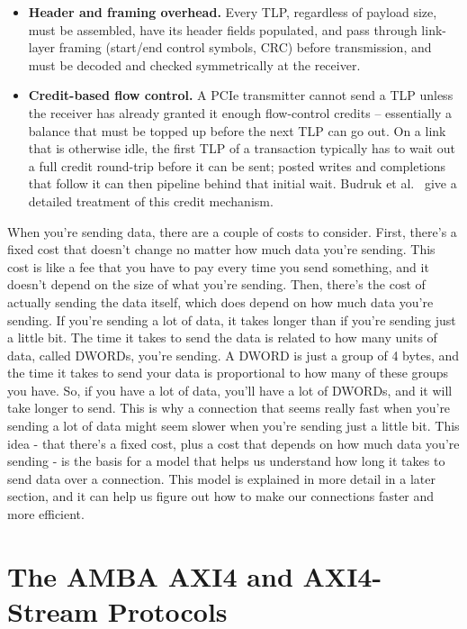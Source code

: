 \begin{itemize}
\item \textbf{Header and framing overhead.} Every TLP, regardless of payload size, must be assembled, have its header fields populated, and pass through link-layer framing (start/end control symbols, CRC) before transmission, and must be decoded and checked symmetrically at the receiver.
\item \textbf{Credit-based flow control.} A PCIe transmitter cannot send a TLP unless the receiver has already granted it enough flow-control credits -- essentially a balance that must be topped up before the next TLP can go out. On a link that is otherwise idle, the first TLP of a transaction typically has to wait out a full credit round-trip before it can be sent; posted writes and completions that follow it can then pipeline behind that initial wait. Budruk et al.~\cite{budruk2004pcie} give a detailed treatment of this credit mechanism.
\end{itemize}

When you're sending data, there are a couple of costs to consider. First, there's a fixed cost that doesn't change no matter how much data you're sending. This cost is like a fee that you have to pay every time you send something, and it doesn't depend on the size of what you're sending. Then, there's the cost of actually sending the data itself, which does depend on how much data you're sending. If you're sending a lot of data, it takes longer than if you're sending just a little bit. The time it takes to send the data is related to how many units of data, called DWORDs, you're sending. A DWORD is just a group of 4 bytes, and the time it takes to send your data is proportional to how many of these groups you have. So, if you have a lot of data, you'll have a lot of DWORDs, and it will take longer to send. This is why a connection that seems really fast when you're sending a lot of data might seem slower when you're sending just a little bit. This idea - that there's a fixed cost, plus a cost that depends on how much data you're sending - is the basis for a model that helps us understand how long it takes to send data over a connection. This model is explained in more detail in a later section, and it can help us figure out how to make our connections faster and more efficient.


\section{The AMBA AXI4 and AXI4-Stream Protocols}
\label{sec:ch3_axi}


